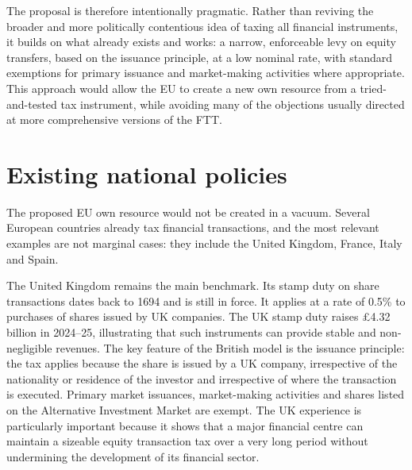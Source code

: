 \documentclass[../../main]{subfiles}
\begin{document}
The proposal is therefore intentionally pragmatic. Rather than reviving the broader and more politically contentious idea of taxing all financial instruments, it builds on what already exists and works: a narrow, enforceable levy on equity transfers, based on the issuance principle, at a low nominal rate, with standard exemptions for primary issuance and market-making activities where appropriate. This approach would allow the EU to create a new own resource from a tried-and-tested tax instrument, while avoiding many of the objections usually directed at more comprehensive versions of the FTT.

\section{Existing national policies}

The proposed EU own resource would not be created in a vacuum. Several European countries already tax financial transactions, and the most relevant examples are not marginal cases: they include the United Kingdom, France, Italy and Spain. 

The United Kingdom remains the main benchmark. Its stamp duty on share transactions dates back to 1694 and is still in force. It applies at a rate of 0.5\% to purchases of shares issued by UK companies. The UK stamp duty raises \pounds{}4.32 billion in 2024--25, illustrating that such instruments can provide stable and non-negligible revenues. The key feature of the British model is the issuance principle: the tax applies because the share is issued by a UK company, irrespective of the nationality or residence of the investor and irrespective of where the transaction is executed. Primary market issuances, market-making activities and shares listed on the Alternative Investment Market are exempt. The UK experience is particularly important because it shows that a major financial centre can maintain a sizeable equity transaction tax over a very long period without undermining the development of its financial sector.
\end{document}

